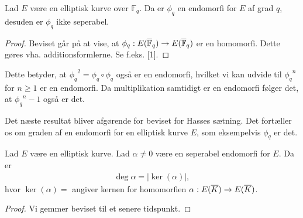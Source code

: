 \begin{lemma}
Lad $E$ være en elliptisk kurve over $\mathbb{F}_q$. Da er $\phi_q$ en 
endomorfi for $E$ af grad $q$, desuden er $\phi_q$ ikke seperabel.
\end{lemma}
\begin{proof}
Beviset går på at vise, at $\phi_q : E(\overline{\mathbb{F}}_q) \to E(\overline{\mathbb{F}}_q)$ er en homomorfi. 
Dette gøres vha. additionsformlerne. Se f.eks. [1].
\end{proof}

Dette betyder, at ${\phi_q}^2 = \phi_q \circ \phi_q$ også er en endomorfi,
hvilket vi kan udvide til ${\phi_q}^n$ for $n \geq 1$ er en endomorfi. 
Da multiplikation samtidigt er en endomorfi følger det, at ${\phi_q}^n -1$ 
også er det. 

Det næste resultat bliver afgørende for beviset for Hasses sætning. 
Det fortæller os om graden af en endomorfi for en elliptisk kurve $E$,
som eksempelvis $\phi_q$ er det.

\begin{proposition}
Lad $E$ være en elliptisk kurve. Lad $\alpha \neq 0$ være en seperabel 
endomorfi for $E$. Da er 
\begin{align*}
	\deg \alpha = |\ker (\alpha)|,
\end{align*}
hvor $\ker (\alpha) = $ angiver kernen for homomorfien 
$\alpha : E(\overline{K}) \to E(\overline{K})$.
\end{proposition}
\begin{proof}
Vi gemmer beviset til et senere tidspunkt.
\end{proof}
